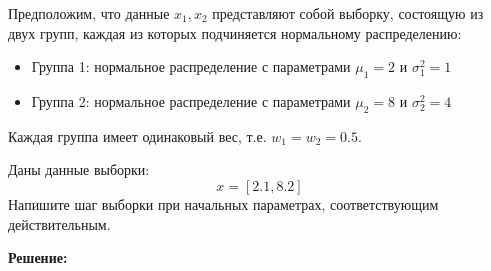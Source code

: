 Предположим, что данные $x_1, x_2$ представляют собой выборку, состоящую из двух групп, каждая из которых подчиняется нормальному распределению:
\begin{itemize}
    \item Группа 1: нормальное распределение с параметрами $\mu_1 = 2$ и $\sigma_1^2 = 1$
    \item Группа 2: нормальное распределение с параметрами $\mu_2 = 8$ и $\sigma_2^2 = 4$
\end{itemize}

Каждая группа имеет одинаковый вес, т.е. $w_1 = w_2 = 0.5$.

Даны данные выборки:
\[
x = [2.1, 8.2]
\]
Напишите шаг выборки при начальных параметрах, соответствующим действительным.
\vspace{0.5cm}

\noindent \textbf{Решение:}


